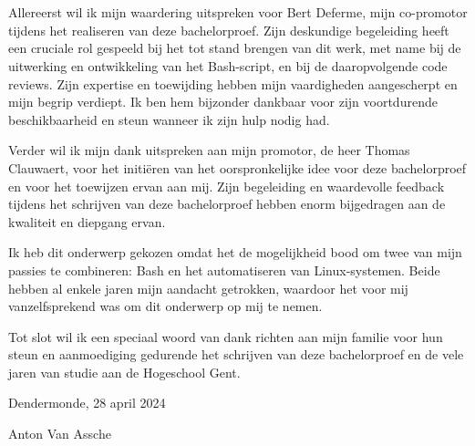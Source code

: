
\chapter*{}%
\label{ch:voorwoord}


Allereerst wil ik mijn waardering uitspreken voor Bert Deferme, mijn co-promotor tijdens het realiseren van deze bachelorproef.
Zijn deskundige begeleiding heeft een cruciale rol gespeeld bij het tot stand brengen van dit werk, met name bij de uitwerking en ontwikkeling van het Bash-script, en bij de daaropvolgende code reviews.
Zijn expertise en toewijding hebben mijn vaardigheden aangescherpt en mijn begrip verdiept.
Ik ben hem bijzonder dankbaar voor zijn voortdurende beschikbaarheid en steun wanneer ik zijn hulp nodig had.

Verder wil ik mijn dank uitspreken aan mijn promotor, de heer Thomas Clauwaert, voor het initi\"eren van het oorspronkelijke idee voor deze bachelorproef en voor het toewijzen ervan aan mij.
Zijn begeleiding en waardevolle feedback tijdens het schrijven van deze bachelorproef hebben enorm bijgedragen aan de kwaliteit en diepgang ervan.

Ik heb dit onderwerp gekozen omdat het de mogelijkheid bood om twee van mijn passies te combineren: Bash en het automatiseren van Linux-systemen.
Beide hebben al enkele jaren mijn aandacht getrokken, waardoor het voor mij vanzelfsprekend was om dit onderwerp op mij te nemen.

Tot slot wil ik een speciaal woord van dank richten aan mijn familie voor hun steun en aanmoediging gedurende het schrijven van deze bachelorproef en de vele jaren van studie aan de Hogeschool Gent.

Dendermonde, 28 april 2024

Anton Van Assche
